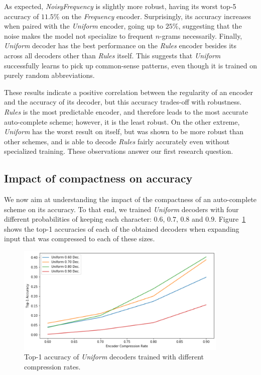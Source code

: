 \documentclass{article}
\begin{document}
As expected, \emph{NoisyFrequency}
is slightly more robust,
having its worst top-5 accuracy
of $11.5$\% on the \emph{Frequency} encoder. Surprisingly, its accuracy
increases when paired with the
\emph{Uniform} encoder, going up to
$25$\%, suggesting that the
noise makes the model not specialize to frequent $n$-grams necessarily.
Finally, \emph{Uniform} decoder has the best performance on the \emph{Rules} encoder besides its across all decoders other than \emph{Rules} itself.
This suggests that \emph{Uniform} successfully learns to pick up common-sense patterns,
even though it is trained on purely random abbreviations.

These results indicate a positive correlation between the regularity of an encoder
and the accuracy of its decoder, but this accuracy trades-off with robustness.
\emph{Rules} is the most predictable encoder, and therefore leads to the most
accurate auto-complete scheme; however, it is the least robust. On the other extreme,
\emph{Uniform} has the worst result on itself, but was shown to be more robust than
other schemes, and is able to decode \emph{Rules} fairly accurately even without
specialized training. These observations answer our first research question.

\subsection{Impact of compactness on accuracy}

We now aim at understanding the impact of the compactness
of an auto-complete scheme on its accuracy.
To that end, we trained \emph{Uniform} decoders
with four different probabilities of keeping each character:
$0.6$, $0.7$, $0.8$ and $0.9$.
Figure~\ref{fig:unif} shows the top-1 accuracies of each
of the obtained decoders when expanding input that was
compressed to each of these sizes.

\begin{figure}
    \centering
    \includegraphics[width=0.9\textwidth]{template/plot_unif.png}
    \caption{Top-1 accuracy of \emph{Uniform} decoders trained
    with different compression rates.}
    \label{fig:unif}
\end{figure}
\end{document}
